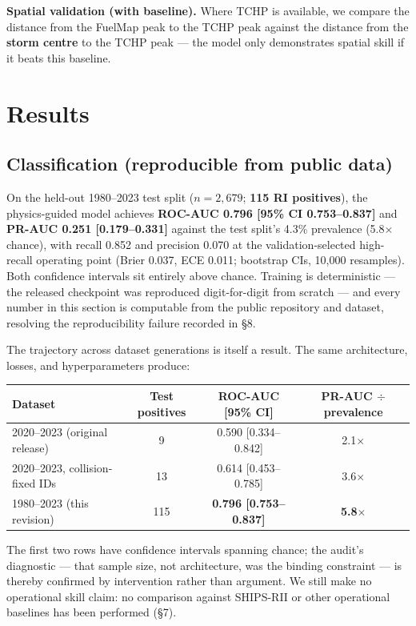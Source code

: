 \documentclass[11pt]{article}
\begin{document}
\textbf{Spatial validation (with baseline).} Where TCHP is available, we
compare the distance from the FuelMap peak to the TCHP peak against the
distance from the \textbf{storm centre} to the TCHP peak --- the model only
demonstrates spatial skill if it beats this baseline.

\section{Results}

\subsection{Classification (reproducible from public data)}

On the held-out 1980--2023 test split ($n = 2{,}679$; \textbf{115 RI
positives}), the physics-guided model achieves \textbf{ROC-AUC 0.796 [95\% CI
0.753--0.837]} and \textbf{PR-AUC 0.251 [0.179--0.331]} against the test
split's 4.3\% prevalence (5.8$\times$ chance), with recall 0.852 and precision 0.070 at the
validation-selected high-recall operating point (Brier 0.037, ECE 0.011;
bootstrap CIs, 10{,}000 resamples). Both confidence intervals sit entirely
above chance. Training is deterministic --- the released checkpoint was
reproduced digit-for-digit from scratch --- and every number in this section
is computable from the public repository and dataset, resolving the
reproducibility failure recorded in \S8.

The trajectory across dataset generations is itself a result. The same
architecture, losses, and hyperparameters produce:

\begin{center}
\begin{tabular}{lccc}
\toprule
Dataset & Test positives & ROC-AUC [95\% CI] & PR-AUC $\div$ prevalence \\
\midrule
2020--2023 (original release) & 9 & 0.590 [0.334--0.842] & 2.1$\times$ \\
2020--2023, collision-fixed IDs & 13 & 0.614 [0.453--0.785] & 3.6$\times$ \\
1980--2023 (this revision) & 115 & \textbf{0.796 [0.753--0.837]} & \textbf{5.8$\times$} \\
\bottomrule
\end{tabular}
\end{center}

The first two rows have confidence intervals spanning chance; the audit's
diagnostic --- that sample size, not architecture, was the binding constraint
--- is thereby confirmed by intervention rather than argument. We still make
no operational skill claim: no comparison against SHIPS-RII or other
operational baselines has been performed (\S7).
\end{document}
